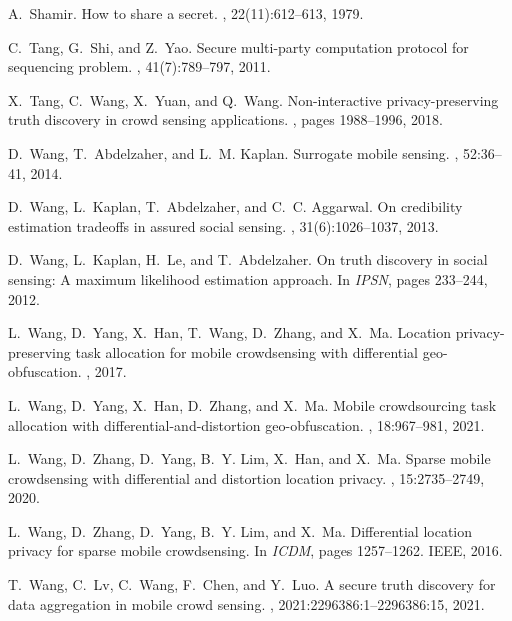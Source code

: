\documentclass[11pt]{article}
\begin{document}
\begin{thebibliography}{10}
A.~Shamir.
\newblock How to share a secret.
, 22(11):612--613, 1979.

C.~Tang, G.~Shi, and Z.~Yao.
\newblock Secure multi-party computation protocol for sequencing problem.
, 41(7):789--797, 2011.

X.~Tang, C.~Wang, X.~Yuan, and Q.~Wang.
\newblock Non-interactive privacy-preserving truth discovery in crowd sensing
  applications.
, pages 1988--1996, 2018.

D.~Wang, T.~Abdelzaher, and L.~M. Kaplan.
\newblock Surrogate mobile sensing.
, 52:36--41, 2014.

D.~Wang, L.~Kaplan, T.~Abdelzaher, and C.~C. Aggarwal.
\newblock On credibility estimation tradeoffs in assured social sensing.
,
  31(6):1026--1037, 2013.

D.~Wang, L.~Kaplan, H.~Le, and T.~Abdelzaher.
\newblock On truth discovery in social sensing: A maximum likelihood estimation
  approach.
\newblock In {\em IPSN}, pages 233--244, 2012.

L.~Wang, D.~Yang, X.~Han, T.~Wang, D.~Zhang, and X.~Ma.
\newblock Location privacy-preserving task allocation for mobile crowdsensing
  with differential geo-obfuscation.
, 2017.

L.~Wang, D.~Yang, X.~Han, D.~Zhang, and X.~Ma.
\newblock Mobile crowdsourcing task allocation with differential-and-distortion
  geo-obfuscation.
,
  18:967--981, 2021.

L.~Wang, D.~Zhang, D.~Yang, B.~Y. Lim, X.~Han, and X.~Ma.
\newblock Sparse mobile crowdsensing with differential and distortion location
  privacy.
,
  15:2735--2749, 2020.

L.~Wang, D.~Zhang, D.~Yang, B.~Y. Lim, and X.~Ma.
\newblock Differential location privacy for sparse mobile crowdsensing.
\newblock In {\em ICDM}, pages 1257--1262. IEEE, 2016.

T.~Wang, C.~Lv, C.~Wang, F.~Chen, and Y.~Luo.
\newblock A secure truth discovery for data aggregation in mobile crowd
  sensing.
, 2021:2296386:1--2296386:15, 2021.


\end{thebibliography}
\end{document}
